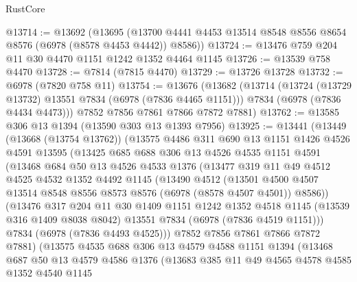 \begin{lexlean}{RustCore}
\begin{coremodule}
@13714 := @13692
    (@13695 (@13700 @4441 @4453 @13514 @8548 @8556 @8654 @8576 (@6978 (@8578 @4453 @4442)) @8586))
@13724 := @13476 @759 @204 @11 @30 @4470 @1151 @1242 @1352 @4464 @1145
@13726 := @13539 @758 @4470
@13728 := @7814 (@7815 @4470)
@13729 := @13726 @13728
@13732 := @6978 (@7820 @758 @11)
@13754 := @13676
    (@13682
      (@13714
        (@13724 (@13729 @13732) @13551 @7834 (@6978 (@7836 @4465 @1151)))
        @7834
        (@6978 (@7836 @4434 @4473)))
      @7852
      @7856
      @7861
      @7866
      @7872
      @7881)
@13762 := @13585 @306 @13 @1394 (@13590 @303 @13 @1393 @7956)
@13925 := @13441
    (@13449
      (@13668 (@13754 @13762))
      (@13575
        @4486
        @311
        @690
        @13
        @1151
        @1426
        @4526
        @4591
        @13595
        (@13425
          @685
          @688
          @306
          @13
          @4526
          @4535
          @1151
          @4591
          (@13468
            @684
            @50
            @13
            @4526
            @4533
            @1376
            (@13477
              @319
              @11
              @49
              @4512
              @4525
              @4532
              @1352
              @4492
              @1145
              (@13490
                @4512
                (@13501
                  @4500
                  @4507
                  @13514
                  @8548
                  @8556
                  @8573
                  @8576
                  (@6978 (@8578 @4507 @4501))
                  @8586))
              (@13476
                @317
                @204
                @11
                @30
                @1409
                @1151
                @1242
                @1352
                @4518
                @1145
                (@13539 @316 @1409 @8038 @8042)
                @13551
                @7834
                (@6978 (@7836 @4519 @1151)))
              @7834
              (@6978 (@7836 @4493 @4525)))
            @7852
            @7856
            @7861
            @7866
            @7872
            @7881)
          (@13575
            @4535
            @688
            @306
            @13
            @4579
            @4588
            @1151
            @1394
            (@13468
              @687
              @50
              @13
              @4579
              @4586
              @1376
              (@13683
                @385
                @11
                @49
                @4565
                @4578
                @4585
                @1352
                @4540
                @1145

\end{coremodule}
\end{lexlean}
